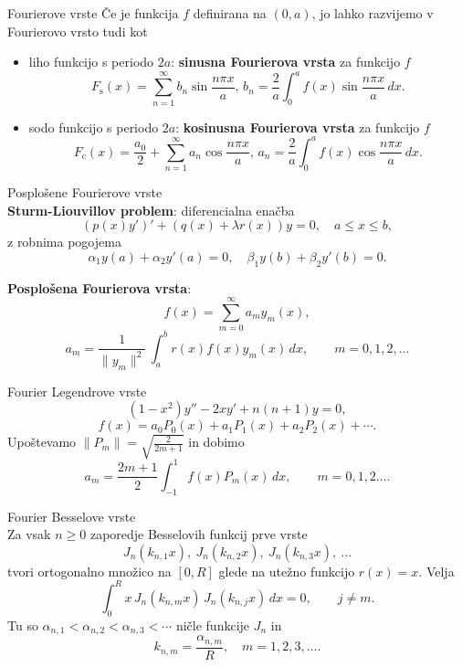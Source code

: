 \documentclass[a4paper,10pt]{article}
\begin{document}
\begin{multicols}{2}
\begin{formulaBox}{Fourierove vrste}
	Če je funkcija $f$ definirana na $(0,a)$, jo lahko razvijemo v Fourierovo vrsto tudi kot
		\begin{itemize}
			\item liho funkcijo s periodo $2a$: 
			\textbf{sinusna Fourierova vrsta} za funkcijo $f$ %
			$$F_\text{s}(x) = \sum_{n=1}^\infty b_n \sin \frac{n\pi x}{a},  \, b_n = \frac{2}{a} \int_0^a \!\!f(x) \sin  \frac{n\pi x}{a}\,dx.$$ 
			\item sodo funkcijo s periodo $2 a$: 
			\textbf{kosinusna Fourierova vrsta} za funkcijo $f$ %
			$$F_\text{c}(x) = \frac{a_0}{2} + \sum_{n=1}^\infty a_n \cos \frac{n\pi x}{a}, \, a_n = \frac{2}{a} \int_0^a \!\! f(x) \cos \frac{n\pi x}{a}\,dx.$$
		\end{itemize}
\end{formulaBox}

\begin{formulaBox}{Posplošene Fourierove vrste}
	\\
	\textbf{Sturm-Liouvillov problem}: diferencialna enačba
	$$	\left(p(x) y'\right)'+(q(x)+\lambda r(x))y=0, \quad a\le x\le b,$$
	z robnima pogojema 
	$$		\alpha_1 y(a)+\alpha_2 y'(a)=0,\quad
		\beta_1 y(b) +\beta_2 y'(b)=0.$$

	\textbf{Posplošena Fourierova vrsta}: $$f(x)=\sum_{m=0}^\infty a_m y_m(x),$$	
	$$
		a_m=\frac{1}{\parallel y_m\parallel ^2}\, \int_a^b r(x)f(x)y_m(x)\,dx,\qquad m=0,1,2,...$$
\end{formulaBox}

\begin{formulaBox}{Fourier Legendrove vrste}
	$$(1-x^2)y''-2xy'+n(n+1)y=0,$$
	$$f(x)=a_0P_0(x)+a_1 P_1(x)+a_2 P_2(x)+\cdots .$$
	Upoštevamo
	$ \parallel P_m\parallel =\sqrt{\frac{2}{2m+1}}$ in dobimo
	$$a_m=\frac{2m+1}{2}\int_{-1}^1 f(x)P_m(x)\, dx,\qquad m=0,1,2\dots.$$
\end{formulaBox}

\begin{formulaBox}{Fourier Besselove vrste}
	\\
	Za vsak $n\ge 0$ zaporedje Besselovih funkcij prve vrste
	$$J_n(k_{n,1}x),\ J_n(k_{n,2}x),\ J_n(k_{n,3}x),\ \ldots
	$$
	tvori ortogonalno množico na $[0,\!R ]$ glede na utežno funkcijo $r(x)\!\!=\!\!x$. Velja
	$$\int_0^Rx\, J_n(k_{n,m}x)\,J_n(k_{n,j}x)\,dx =0,\qquad j\ne m.$$
	Tu so  $\alpha_{n,1}< \alpha_{n,2}< \alpha_{n,3}<\cdots$ ničle funkcije $J_n$ %
	in 
	$$
	k_{n,m}=\frac{\alpha_{n,m}}{R},\quad m=1,2,3,\ldots.
	$$


\end{formulaBox}
\end{multicols}
\end{document}
